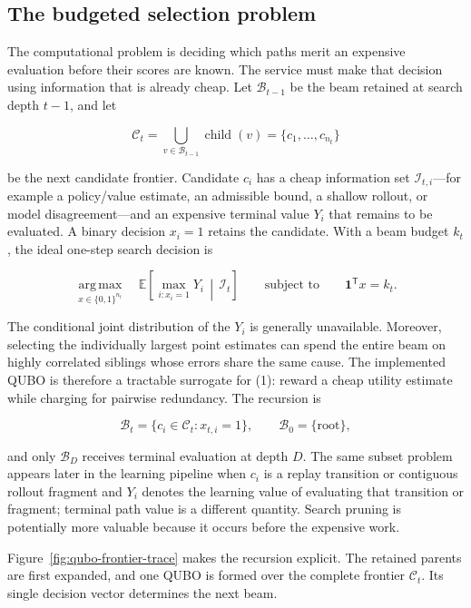 \documentclass{strategynet-journal}
\newcommand{\E}{\mathbb{E}}
\begin{document}
\subsection{The budgeted selection problem}

The computational problem is deciding which paths merit an expensive evaluation
before their scores are known.  The service must make that decision
using information that is already cheap.  Let $\mathcal{B}_{t-1}$ be the beam
retained at search depth $t-1$, and let

\[
 \mathcal{C}_t
 =\bigcup_{v\in\mathcal{B}_{t-1}}\operatorname{child}(v)
 =\{c_1,\ldots,c_{n_t}\}
\]

be the next candidate frontier.  Candidate $c_i$ has a cheap information set
$\mathcal{I}_{t,i}$---for example a policy/value estimate, an admissible bound,
a shallow rollout, or model disagreement---and an expensive terminal
value $Y_i$ that remains to be evaluated.  A binary decision $x_i=1$ retains the candidate.  With a beam
budget $k_t$, the ideal one-step search decision is

\[
 \underset{x\in\{0,1\}^{n_t}}{\operatorname{arg\,max}}
 \quad
 \E\!\left[
   \max_{i:x_i=1}Y_i\,\middle|\,\mathcal{I}_t
 \right]
 \qquad
 \text{subject to}\qquad
 \mathbf{1}^{\mathsf T}x=k_t .
 \tag{1}
\]

The conditional joint distribution of the $Y_i$ is generally unavailable.
Moreover, selecting the individually largest point estimates can spend the
entire beam on highly correlated siblings whose errors share the same cause.
The implemented QUBO is therefore a tractable surrogate for (1): reward a
cheap utility estimate while charging for pairwise redundancy.  The recursion
is

\[
 \mathcal{B}_{t}=\{c_i\in\mathcal{C}_t:x_{t,i}=1\},
 \qquad \mathcal{B}_0=\{\text{root}\},
 \tag{2}
\]

and only $\mathcal{B}_D$ receives terminal evaluation at depth $D$.  The same
subset problem appears later in the learning pipeline when $c_i$ is a replay
transition or contiguous rollout fragment and $Y_i$ denotes the learning value
of evaluating that transition or fragment; terminal path value is a different
quantity.  Search pruning is potentially more
valuable because it occurs before the expensive work.

Figure~\ref{fig:qubo-frontier-trace} makes the recursion explicit.  The retained
parents are first expanded, and one QUBO is formed over the complete frontier
$\mathcal{C}_t$.  Its single decision vector determines the next beam.
\end{document}
